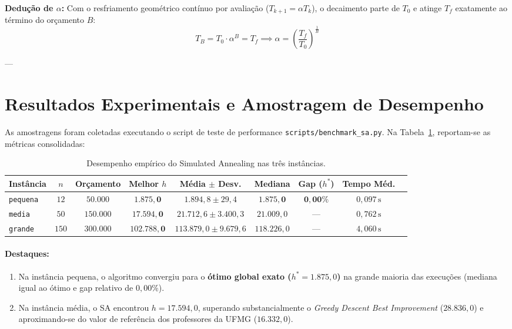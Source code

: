 \documentclass[11pt,a4paper]{article}
\begin{document}
\noindent\textbf{Dedução de $\alpha$:} Com o resfriamento geométrico contínuo por avaliação ($T_{k+1} = \alpha T_k$), o decaimento parte de $T_0$ e atinge $T_f$ exatamente ao término do orçamento $B$:
\begin{equation}
T_B = T_0 \cdot \alpha^B = T_f \implies \alpha = \left(\frac{T_f}{T_0}\right)^{\frac{1}{B}}
\end{equation}

---

\section{Resultados Experimentais e Amostragem de Desempenho}

As amostragens foram coletadas executando o script de teste de performance \texttt{scripts/benchmark\_sa.py}. Na Tabela~\ref{tab:resultados}, reportam-se as métricas consolidadas:

\begin{table}[h!]
\centering
\small
\caption{Desempenho empírico do Simulated Annealing nas três instâncias.}
\label{tab:resultados}
\begin{tabular}{lcccccccc}
\toprule
\textbf{Instância} & $n$ & \textbf{Orçamento} & \textbf{Melhor $h$} & \textbf{Média $\pm$ Desv.} & \textbf{Mediana} & \textbf{Gap ($h^*$)} & \textbf{Tempo Méd.} \\
\midrule
\texttt{pequena} & $12$  & $50.000$  & $\mathbf{1.875,0}$ & $1.894,8 \pm 29,4$ & $\mathbf{1.875,0}$ & $\mathbf{0,00\%}$ & $0,097\,\text{s}$ \\
\texttt{media}   & $50$  & $150.000$ & $\mathbf{17.594,0}$ & $21.712,6 \pm 3.400,3$ & $21.009,0$ & — & $0,762\,\text{s}$ \\
\texttt{grande}  & $150$ & $300.000$ & $\mathbf{102.788,0}$ & $113.879,0 \pm 9.679,6$ & $118.226,0$ & — & $4,060\,\text{s}$ \\
\bottomrule
\end{tabular}
\end{table}

\paragraph{Destaques:}
\begin{enumerate}
    \item Na instância pequena, o algoritmo convergiu para o \textbf{ótimo global exato ($h^* = 1.875,0$)} na grande maioria das execuções (mediana igual ao ótimo e gap relativo de $0,00\%$).
    \item Na instância média, o SA encontrou $h = 17.594,0$, superando substancialmente o \textit{Greedy Descent Best Improvement} ($28.836,0$) e aproximando-se do valor de referência dos professores da UFMG ($16.332,0$).
\end{enumerate}
\end{document}
